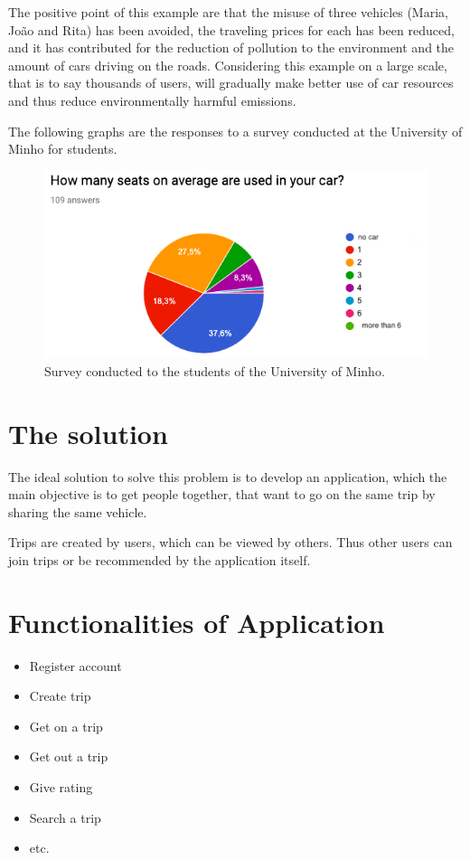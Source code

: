 \documentclass{article}
\begin{document}
\hspace{5mm} The positive point of this example are that the misuse of three vehicles (Maria, João and Rita) has been avoided, the traveling prices for each has been reduced, and it has contributed for the reduction of pollution to the environment and the amount of cars driving on the roads. Considering this example on a large scale, that is to say thousands of users, will gradually make better use of car resources and thus reduce environmentally harmful emissions.

\hspace{5mm} The following graphs are the responses to a survey conducted at the University of Minho for students.

\begin{figure}[H]
    \centering
	\includegraphics[scale=0.50]{g2.png}
	\caption{Survey conducted to the students of the University of Minho.}
	\label{img:duc2}
\end{figure}

\section{The solution}

\hspace{5mm}The ideal solution to solve this problem is to develop an application, which the main objective is to get people together, that want to go on the same trip by sharing the same vehicle.

\hspace{5mm} Trips are created by users, which can be viewed by others. Thus other users can join trips or be recommended by the application itself.

\section{Functionalities of Application}

\begin{itemize}
    \item Register account
    \item Create trip
    \item Get on a trip
    \item Get out a trip
    \item Give rating
    \item Search a trip
    \item etc.
\end{itemize}{}
\end{document}
